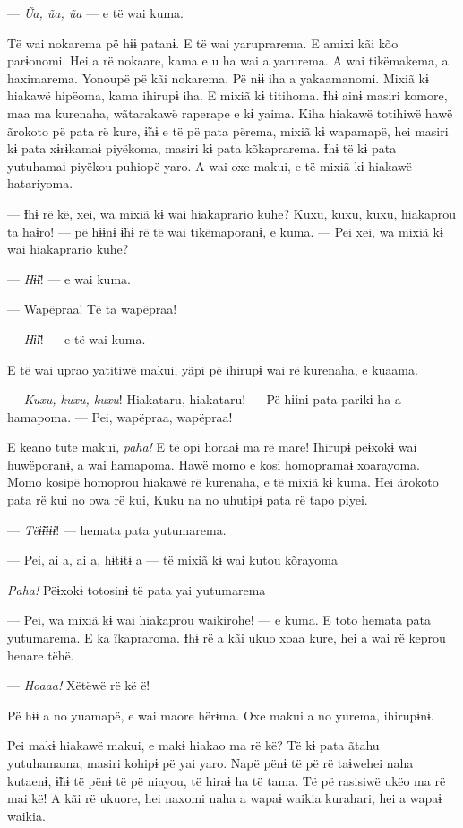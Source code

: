 --- \textit{Ũa, ũa, ũa} --- e të wai kuma. 

Të wai nokarema pë hɨɨ patanɨ. E të wai yaruprarema. E amixi kãi kõo
 parɨonomi. Hei a rë nokaare, kama e u ha wai a yarurema. A wai
 tikëmakema, a haximarema. Yonoupë pë kãi nokarema. Pë nɨɨ iha a
 yakaamanomi. Mixiã kɨ hiakawë hipëoma, kama ihirupɨ iha. E mixiã kɨ
 titihoma. Ɨhɨ ainɨ masiri komore, maa ma kurenaha, wãtarakawë raperape e
 kɨ yaima. Kiha hiakawë totihiwë hawë ãrokoto pë pata rë kure, ɨ̃hɨ e të
 pë pata përema, mixiã kɨ wapamapë, hei masiri kɨ pata xɨrɨkamaɨ
 piyëkoma, masiri kɨ pata kõkaprarema. Ɨhɨ të kɨ pata yutuhamaɨ piyëkou
 puhiopë yaro. A wai oxe makui, e të mixiã kɨ hiakawë hatariyoma. 

--- Ɨhɨ rë kë, xei, wa mixiã kɨ wai hiakaprario kuhe? Kuxu, kuxu, kuxu,
hiakaprou ta haɨro! --- pë hɨɨnɨ ɨ̃hɨ rë të wai tikëmaporanɨ, e kuma. ---
Pei xei, wa mixiã kɨ wai hiakaprario kuhe?

--- \textit{Hɨ̃ɨ}! --- e wai kuma. 

--- Wapëpraa! Të ta wapëpraa! 

--- \textit{Hɨ̃ɨ}! --- e të wai kuma. 

E të wai uprao yatitiwë makui, yãpi pë ihirupɨ wai rë kurenaha, e
 kuaama. 

--- \textit{Kuxu, kuxu, kuxu}! Hiakataru, hiakataru! --- Pë hɨɨnɨ pata parɨkɨ ha a
hamapoma. --- Pei, wapëpraa, wapëpraa! 

E keano tute makui, \textit{paha!} E të opi horaaɨ ma rë mare! Ihirupɨ pëɨxokɨ
wai huwëporanɨ, a wai hamapoma. Hawë momo e kosi homopramaɨ xoarayoma.
Momo kosipë homoprou hiakawë rë kurenaha, e të mixiã kɨ kuma. Hei
ãrokoto pata rë kui no owa rë kui, Kuku na no uhutipɨ pata rë tapo
piyei. 

--- \textit{Tëɨ̃ɨɨɨɨ}! --- hemata pata yutumarema. 

--- Pei, ai a, ai a, hɨtɨtɨ a --- të mixiã kɨ wai kutou kõrayoma 

\textit{Paha!} Pëɨxokɨ totosinɨ të pata yai yutumarema 

--- Pei, wa mixiã kɨ wai hiakaprou waikirohe! --- e kuma. E toto hemata
pata yutumarema. E ka ĩkapraroma. Ɨhɨ rë a kãi ukuo xoaa kure, hei a wai
rë keprou henare tëhë. 

--- \textit{Hoaaa!} Xëtëwë rë kë ë! 

Pë hɨɨ a no yuamapë, e wai maore hërɨma. Oxe makui a no yurema,
 ihirupɨnɨ. 

Pei makɨ hiakawë makui, e makɨ hiakao ma rë kë? Të kɨ pata ãtahu
yutuhamama, masiri kohipɨ pë yai yaro. Napë pënɨ të pë rë taɨwehei naha
kutaenɨ, ɨ̃hɨ të pënɨ të pë niayou, të hiraɨ ha të tama. Të pë rasisiwë
ukëo ma rë mai kë! A kãi rë ukuore, hei naxomi naha a wapaɨ waikia
kurahari, hei a wapaɨ waikia. 

